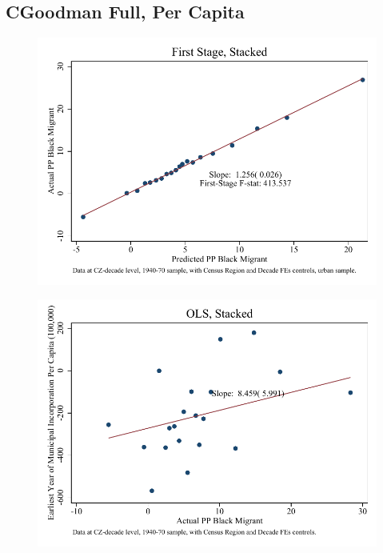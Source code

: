 \documentclass{article}
\begin{document}
\subsection{CGoodman Full, Per Capita}

\clearpage
\begin{figure}
\centering
\includegraphics{figures/simplefigs/stacked_cgoodman_full_pc_C3_urban_fs.pdf}
\end{figure}
\clearpage
\begin{figure}
\centering
\includegraphics{figures/simplefigs/stacked_cgoodman_full_pc_C3_urban_ols.pdf}
\end{figure}
\clearpage
\end{document}

